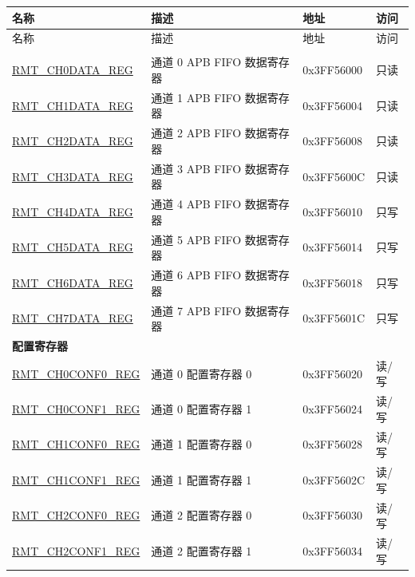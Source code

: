 \begin{longtable}{|p{5cm}|p{6.8cm} | p{2cm} | p{1.2cm} | }
\hline\rowcolor{lightgray}
名称 & 描述 &  地址 & 访问 \\ \hline
\endfirsthead
        \hline
        \rowcolor{lightgray}
       名称 & 描述 & 地址 & 访问  \\
        \hline
        \endhead
        \endfoot
\multicolumn{4}{|l|}{\textbf{数据寄存器}} \\ \hline
\hyperref[regdesc:RMTCHnDATAREG]{RMT\_CH0DATA\_REG} & 通道 0 APB FIFO 数据寄存器 & 0x3FF56000 & 只读 \\ \hline
\hyperref[regdesc:RMTCHnDATAREG]{RMT\_CH1DATA\_REG} & 通道 1 APB FIFO 数据寄存器 & 0x3FF56004 & 只读 \\ \hline
\hyperref[regdesc:RMTCHnDATAREG]{RMT\_CH2DATA\_REG} & 通道 2 APB FIFO 数据寄存器 & 0x3FF56008 & 只读 \\ \hline
\hyperref[regdesc:RMTCHnDATAREG]{RMT\_CH3DATA\_REG} & 通道 3 APB FIFO 数据寄存器 & 0x3FF5600C & 只读 \\ \hline
\hyperref[regdesc:RMTCHMDATAREG]{RMT\_CH4DATA\_REG} & 通道 4 APB FIFO 数据寄存器 & 0x3FF56010 & 只写 \\ \hline
\hyperref[regdesc:RMTCHMDATAREG]{RMT\_CH5DATA\_REG} & 通道 5 APB FIFO 数据寄存器 & 0x3FF56014 & 只写 \\ \hline
\hyperref[regdesc:RMTCHMDATAREG]{RMT\_CH6DATA\_REG} & 通道 6 APB FIFO 数据寄存器 & 0x3FF56018 & 只写 \\ \hline
\hyperref[regdesc:RMTCHMDATAREG]{RMT\_CH7DATA\_REG} & 通道 7 APB FIFO 数据寄存器 & 0x3FF5601C & 只写 \\ \hline
\multicolumn{4}{|l|}{\textbf{配置寄存器}} \\ \hline
\hyperref[regdesc:RMTCHnCONF0REG]{RMT\_CH0CONF0\_REG} & 通道 0 配置寄存器 0 & 0x3FF56020 & 读/写 \\ \hline
\hyperref[regdesc:RMTCHnCONF1REG]{RMT\_CH0CONF1\_REG} & 通道 0 配置寄存器 1 & 0x3FF56024 & 读/写 \\ \hline
\hyperref[regdesc:RMTCHnCONF0REG]{RMT\_CH1CONF0\_REG} & 通道 1 配置寄存器 0 & 0x3FF56028 & 读/写 \\ \hline
\hyperref[regdesc:RMTCHnCONF1REG]{RMT\_CH1CONF1\_REG} & 通道 1 配置寄存器 1 & 0x3FF5602C & 读/写 \\ \hline
\hyperref[regdesc:RMTCHnCONF0REG]{RMT\_CH2CONF0\_REG} & 通道 2 配置寄存器 0 & 0x3FF56030 & 读/写 \\ \hline
\hyperref[regdesc:RMTCHnCONF1REG]{RMT\_CH2CONF1\_REG} & 通道 2 配置寄存器 1 & 0x3FF56034 & 读/写 \\ \hline

\end{longtable}
